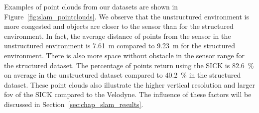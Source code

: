 Examples of point clouds from our datasets are shown in Figure~\ref{fig:slam_pointclouds}. We observe that the unstructured environment is more congested and objects are closer to the sensor than for the structured environment. In fact, the average distance of points from the sensor in the unstructured environment is \SI{7.61}{\meter} compared to \SI{9.23}{\meter} for the structured environment. There is also more space without obstacle in the sensor range for the structured dataset. The percentage of points return using the SICK is \SI{82.6}{\percent} on average in the unstructured dataset compared to \SI{40.2}{\percent} in the structured dataset. These point clouds also illustrate the higher vertical resolution and larger \gls*{fov} of the SICK compared to the Velodyne. The influence of these factors will be discussed in Section~\ref{sec:chap_slam_results}.

